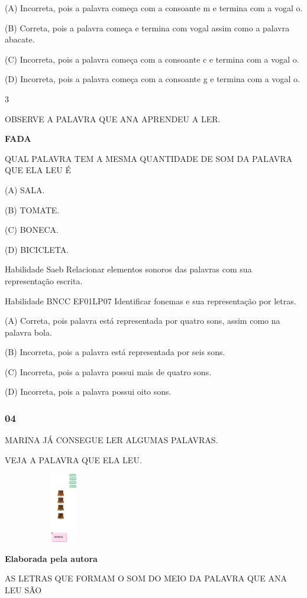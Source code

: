 \begin{escola}
(A) Incorreta, pois a palavra começa com a consoante m e termina com a
vogal o.

(B) Correta, pois a palavra começa e termina com vogal assim como a
palavra abacate.

(C) Incorreta, pois a palavra começa com a consoante c e termina com a
vogal o.

(D) Incorreta, pois a palavra começa com a consoante g e termina com a
vogal o.

\num{3}

OBSERVE A PALAVRA QUE ANA APRENDEU A LER.

\textbf{FADA}

QUAL PALAVRA TEM A MESMA QUANTIDADE DE SOM DA PALAVRA QUE ELA LEU É

(A) SALA.

(B) TOMATE.

(C) BONECA.

(D) BICICLETA.

Habilidade Saeb Relacionar elementos sonoros das palavras com sua
representação escrita.

Habilidade BNCC EF01LP07 Identificar fonemas e sua representação por
letras.

(A) Correta, pois palavra está representada por quatro sons, assim como
na palavra bola.

(B) Incorreta, pois a palavra está representada por seis sons.

(C) Incorreta, pois a palavra possui mais de quatro sons.

(D) Incorreta, pois a palavra possui oito sons.

\subsubsection{04}\label{section-44}

MARINA JÁ CONSEGUE LER ALGUMAS PALAVRAS.

VEJA A PALAVRA QUE ELA LEU.

\includegraphics[width=2.07917in,height=1.19306in]{media/image213.png}

\textbf{Elaborada pela autora}

AS LETRAS QUE FORMAM O SOM DO MEIO DA PALAVRA QUE ANA LEU SÃO


\end{escola}

